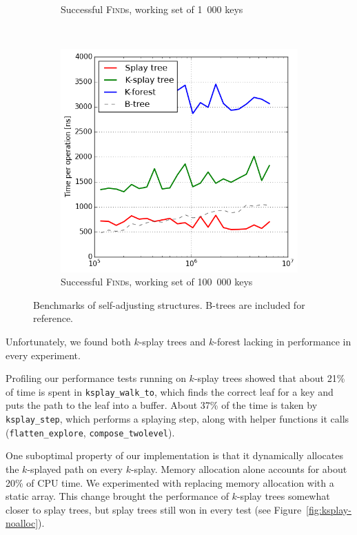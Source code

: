\begin{figure}
\begin{subfigure}[t]{0.31\textwidth}
	\caption{Successful \textsc{Find}s, working set of 1~000 keys}
	\label{fig:sub:self-adj-ws-1k}
\end{subfigure}
~
\begin{subfigure}[t]{0.31\textwidth}
	\includegraphics[width=\textwidth]{img/performance/self-adj-ws-100k}
	\caption{Successful \textsc{Find}s, working set of 100~000 keys}
	\label{fig:sub:self-adj-ws-100k}
\end{subfigure}
\caption{Benchmarks of self-adjusting structures.
	B-trees are included for reference.}
\label{fig:self-adj-performance}
\end{figure}

Unfortunately, we found both $k$-splay trees and $k$-forest lacking in
performance in every experiment.

Profiling our performance tests running on $k$-splay trees showed that about
21\% of time is spent in \texttt{ksplay\_walk\_to}, which finds the correct
leaf for a key and puts the path to the leaf into a buffer. About 37\% of the
time is taken by \texttt{ksplay\_step}, which performs a splaying step, along
with helper functions it calls (\texttt{flatten\_explore},
\texttt{compose\_twolevel}).

One suboptimal property of our implementation is that it dynamically
allocates the $k$-splayed path on every $k$-splay. Memory allocation alone
accounts for about 20\% of CPU time.
We experimented with replacing memory allocation with a static array.
This change brought the performance of $k$-splay trees somewhat closer to
splay trees, but splay trees still won in every test
(see Figure~\ref{fig:ksplay-noalloc}).


